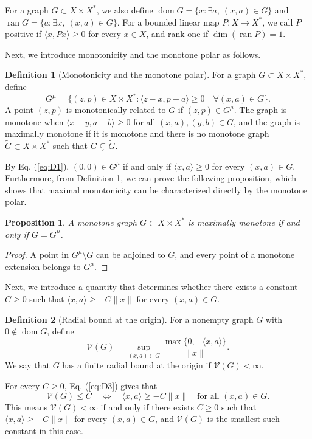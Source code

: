 \documentclass[11pt]{article}
\newcommand{\dom}{\operatorname{dom}}
\newcommand{\pair}[2]{\langle #1,#2\rangle}
\newtheorem{proposition}{Proposition}
\theoremstyle{definition}
\newtheorem{definition}{Definition}
\theoremstyle{remark}
\begin{document}
For a graph $G\subset X\times X^*$, we also define $\dom G=\{x:\exists a,\ (x,a)\in G\}$ and $\operatorname{ran}G=\{a:\exists x,\ (x,a)\in G\}$. 
For a bounded linear map $P:X\to X^*$, we call $P$ positive if $\pair{x}{Px}\ge0$ for every $x\in X$, and rank one if $\dim(\operatorname{ran}P)=1$. 

Next, we introduce monotonicity and the monotone polar  \cite{martinezsvaiter2005,bauschkemclarensendov2006} as follows. 

\begin{definition}[Monotonicity and the monotone polar]
\label{D1}
For a graph $G\subset X\times X^*$, define
\begin{equation}
G^\mu=\{(z,p)\in X\times X^*:
 \pair{z-x}{p-a}\ge0\quad\forall(x,a)\in G\}.
\label{eq:D1}
\end{equation}
A point $(z,p)$ is monotonically related to $G$ if $(z,p)\in G^\mu$.
The graph is monotone when $\pair{x-y}{a-b}\ge0$ for all $(x,a),(y,b)\in G$, and the graph is maximally monotone if it is monotone and there is no monotone graph $\widetilde G\subset X\times X^*$ such that $G\subsetneq\widetilde G$. 
\end{definition}

By Eq. (\ref{eq:D1}), $(0,0)\in G^\mu$ if and only if $\pair{x}{a}\ge0$ for every $(x,a)\in G$. Furthermore, from Definition \ref{D1}, we can prove the following proposition, which shows that maximal monotonicity can be characterized directly by the monotone polar. 


\begin{proposition}
A monotone graph $G\subset X\times X^*$ is maximally monotone if and only if $G=G^\mu$.
\end{proposition}
\begin{proof}
A point in $G^\mu\setminus G$ can be adjoined to $G$, and every point of a monotone extension belongs to $G^\mu$.
\end{proof}


Next, we introduce a quantity that determines whether there exists a constant $C\ge0$ such that $\pair{x}{a}\ge-C\|x\|$ for every $(x,a)\in G$. 

\begin{definition}[Radial bound at the origin]
\label{def:radial-bound}
For a nonempty graph $G$ with $0\notin\dom G$, define
\begin{equation}
\mathcal V(G)=\sup_{(x,a)\in G}
 \frac{\max\{0,-\pair{x}{a}\}}{\|x\|}.
\label{eq:D3}
\end{equation}
We say that $G$ has a finite radial bound at the origin if $\mathcal V(G)<\infty$.
\end{definition}
For every $C\ge0$, Eq. (\ref{eq:D3}) gives that 
\[
\mathcal V(G)\le C
\quad\Longleftrightarrow\quad
\pair{x}{a}\ge-C\|x\|
\quad\text{for all }(x,a)\in G.
\]
This means $\mathcal V(G)<\infty$ if and only if there exists $C\ge0$ such that $\pair{x}{a}\ge-C\|x\|$ for every $(x,a)\in G$, and $\mathcal V(G)$ is the smallest such constant in this case. 
\end{document}
